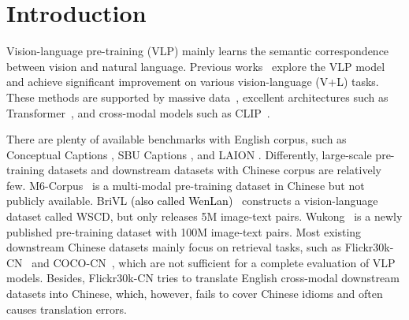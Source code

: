 \documentclass[sigconf]{acmart}
\def\mmljc{\textcolor{black}}
\def\mmcr{\textcolor{black}}
\begin{document}
\maketitle

\section{Introduction}

Vision-language pre-training (VLP) mainly learns the semantic correspondence between vision and natural language.
Previous works~\cite{visualbert,FLAVA,VL-T5,OFA} explore the VLP model and achieve significant improvement on various vision-language (V+L) tasks. These methods are supported by massive data~\cite{LAION-400M}, excellent architectures such as Transformer~\cite{Transformer}, and cross-modal models such as CLIP~\cite{CLIP}.


There are plenty of available benchmarks with English corpus, such as Conceptual
Captions \cite{CC}, SBU Captions \cite{SBU}, and LAION \cite{LAION-400M}. Differently, large-scale pre-training datasets and downstream datasets with Chinese corpus are relatively few.
M6-Corpus~\cite{M6} is a multi-modal pre-training dataset in Chinese but not publicly available. BriVL \mmcr{(also called WenLan)}~\cite{wenlan2} constructs a vision-language dataset called WSCD, but only releases 5M image-text pairs. Wukong~\cite{gu2022wukong} is a newly published pre-training dataset with 100M image-text pairs.
Most existing downstream Chinese datasets mainly focus on retrieval tasks, such as Flickr30k-CN~\cite{flickr30k-cn} and COCO-CN~\cite{coco-cn}, which are not sufficient for a complete evaluation of VLP models.
Besides, Flickr30k-CN tries to translate English cross-modal downstream datasets into Chinese, \mmljc{which}, however, fails to cover Chinese idioms and often causes translation errors.
\end{document}
